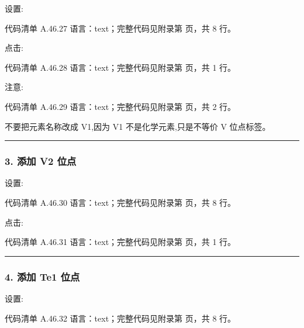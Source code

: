 \documentclass[lang=cn,scheme=chinese,color=blue,device=normal,toc=onecol,math=cm]{elegantbook}
\begin{document}
设置:\par


\begin{codeindexbox}{代码清单 A.46.27}
语言：text；完整代码见附录第 \pageref{code:46:27} 页，共 8 行。
\end{codeindexbox}


点击:\par


\begin{codeindexbox}{代码清单 A.46.28}
语言：text；完整代码见附录第 \pageref{code:46:28} 页，共 1 行。
\end{codeindexbox}


注意:\par


\begin{codeindexbox}{代码清单 A.46.29}
语言：text；完整代码见附录第 \pageref{code:46:29} 页，共 2 行。
\end{codeindexbox}


不要把元素名称改成 V1,因为 V1 不是化学元素,只是不等价 V 位点标签。\par


\medskip\hrule\medskip


\subsubsection{3. 添加 V2 位点}


设置:\par


\begin{codeindexbox}{代码清单 A.46.30}
语言：text；完整代码见附录第 \pageref{code:46:30} 页，共 8 行。
\end{codeindexbox}


点击:\par


\begin{codeindexbox}{代码清单 A.46.31}
语言：text；完整代码见附录第 \pageref{code:46:31} 页，共 1 行。
\end{codeindexbox}


\medskip\hrule\medskip


\subsubsection{4. 添加 Te1 位点}


设置:\par


\begin{codeindexbox}{代码清单 A.46.32}
语言：text；完整代码见附录第 \pageref{code:46:32} 页，共 8 行。
\end{codeindexbox}
\end{document}
